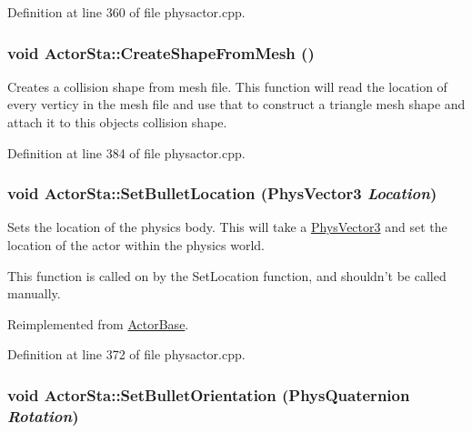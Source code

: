 Definition at line 360 of file physactor.cpp.\hypertarget{classActorSta_a12e78aa21e50e6964330e25affa421c9}{
\subsubsection[{CreateShapeFromMesh}]{\setlength{\rightskip}{0pt plus 5cm}void ActorSta::CreateShapeFromMesh ()}}
\label{d3/daf/classActorSta_a12e78aa21e50e6964330e25affa421c9}


Creates a collision shape from mesh file. This function will read the location of every verticy in the mesh file and use that to construct a triangle mesh shape and attach it to this objects collision shape. 

Definition at line 384 of file physactor.cpp.\hypertarget{classActorSta_a472768e39d3ac67f35b9f74e5a679b99}{
\subsubsection[{SetBulletLocation}]{\setlength{\rightskip}{0pt plus 5cm}void ActorSta::SetBulletLocation ({\bf PhysVector3} {\em Location})}}
\label{d3/daf/classActorSta_a472768e39d3ac67f35b9f74e5a679b99}


Sets the location of the physics body. This will take a \hyperlink{classPhysVector3}{PhysVector3} and set the location of the actor within the physics world. \par
 This function is called on by the SetLocation function, and shouldn't be called manually. 

Reimplemented from \hyperlink{classActorBase_af64a57138bbd32c52581a5c8d0d29a76}{ActorBase}.

Definition at line 372 of file physactor.cpp.\hypertarget{classActorSta_ab038b2ce4e25fa3441e9b081cef7879e}{
\subsubsection[{SetBulletOrientation}]{\setlength{\rightskip}{0pt plus 5cm}void ActorSta::SetBulletOrientation ({\bf PhysQuaternion} {\em Rotation})}}
\label{d3/daf/classActorSta_ab038b2ce4e25fa3441e9b081cef7879e}


